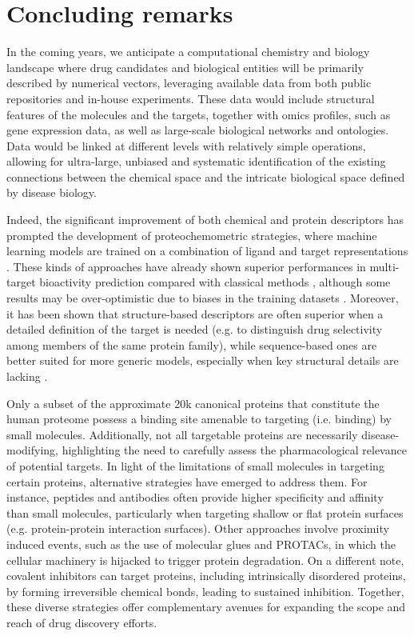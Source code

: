 \chapter{Concluding remarks}
\label{concluding}
\clearpage

In the coming years, we anticipate a computational chemistry and biology landscape where drug candidates and biological entities will be primarily described by numerical vectors, leveraging available data from both public repositories and in-house experiments. These data would include structural features of the molecules and the targets, together with omics profiles, such as gene expression data, as well as large-scale biological networks and ontologies. Data would be linked at different levels with relatively simple operations, allowing for ultra-large, unbiased and systematic identification of the existing connections between the chemical space and the intricate biological space defined by disease biology. 

Indeed, the significant improvement of both chemical and protein descriptors has prompted the development of proteochemometric strategies, where machine learning models are trained on a combination of ligand and target representations \cite{bongers_proteochemometrics_2019}. These kinds of approaches have already shown superior performances in multi-target bioactivity prediction compared with classical methods \cite{torng_graph_2019}, although some results may be over-optimistic due to biases in the training datasets \cite{chen_hidden_2019}. Moreover, it has been shown that structure-based descriptors are often superior when a detailed definition of the target is needed (e.g. to distinguish drug selectivity among members of the same protein family), while sequence-based ones are better suited for more generic models, especially when key structural details are lacking \cite{bongers_proteochemometrics_2019}.

Only a subset of the approximate 20k canonical proteins that constitute the human proteome possess a binding site amenable to targeting (i.e. binding) by small molecules. Additionally, not all targetable proteins are necessarily disease-modifying, highlighting the need to carefully assess the pharmacological relevance of potential targets. In light of the limitations of small molecules in targeting certain proteins, alternative strategies have emerged to address them. For instance, peptides and antibodies often provide higher specificity and affinity than small molecules, particularly when targeting shallow or flat protein surfaces (e.g. protein-protein interaction surfaces). Other approaches involve proximity induced events, such as the use of molecular glues and PROTACs, in which the cellular machinery is hijacked to trigger protein degradation. On a different note, covalent inhibitors can target proteins, including intrinsically disordered proteins, by forming irreversible chemical bonds, leading to sustained inhibition. Together, these diverse strategies offer complementary avenues for expanding the scope and reach of drug discovery efforts. 

